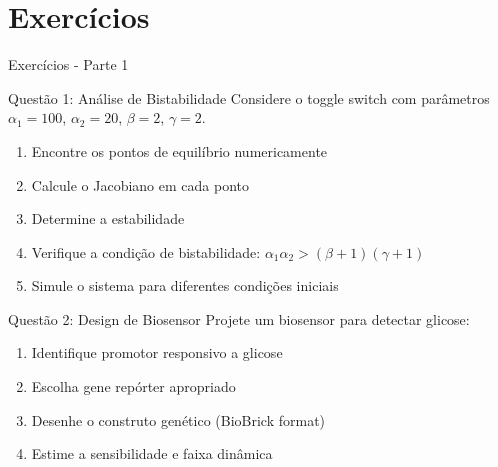 \section{Exercícios}

\begin{frame}{Exercícios - Parte 1}
\begin{block}{Questão 1: Análise de Bistabilidade}
Considere o toggle switch com parâmetros $\alpha_1 = 100$, $\alpha_2 = 20$, $\beta = 2$, $\gamma = 2$.

\begin{enumerate}
    \item Encontre os pontos de equilíbrio numericamente
    \item Calcule o Jacobiano em cada ponto
    \item Determine a estabilidade
    \item Verifique a condição de bistabilidade: $\alpha_1 \alpha_2 > (\beta + 1)(\gamma + 1)$
    \item Simule o sistema para diferentes condições iniciais
\end{enumerate}
\end{block}

\begin{block}{Questão 2: Design de Biosensor}
Projete um biosensor para detectar glicose:
\begin{enumerate}
    \item Identifique promotor responsivo a glicose
    \item Escolha gene repórter apropriado
    \item Desenhe o construto genético (BioBrick format)
    \item Estime a sensibilidade e faixa dinâmica
\end{enumerate}
\end{block}
\end{frame}


